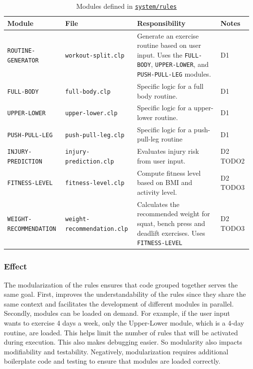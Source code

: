 \documentclass{article}
\begin{document}
\begin{table}[h]
\centering
\begin{tabular}{|l|l|p{5cm}|l|}
\hline
\textbf{Module} & \textbf{File} & \textbf{Responsibility} & \textbf{Notes} \\
\hline
\texttt{ROUTINE-GENERATOR} & \texttt{workout-split.clp} & Generate an exercise routine based on user input. Uses the \texttt{FULL-BODY}, \texttt{UPPER-LOWER}, and \texttt{PUSH-PULL-LEG} modules. & D1 \\
\hline
\texttt{FULL-BODY} & \texttt{full-body.clp} & Specific logic for a full body routine. & D1 \\
\hline
\texttt{UPPER-LOWER} & \texttt{upper-lower.clp} & Specific logic for a upper-lower routine. & D1 \\
\hline
\texttt{PUSH-PULL-LEG} & \texttt{push-pull-leg.clp} & Specific logic for a push-pull-leg routine & D1 \\
\hline
\texttt{INJURY-PREDICTION} & \texttt{injury-prediction.clp} & Evaluates injury risk from user input. & D2 TODO2 \\
\hline
\texttt{FITNESS-LEVEL} & \texttt{fitness-level.clp} & Compute fitness level based on BMI and activity level. & D2 TODO3 \\
\hline
\texttt{WEIGHT-RECOMMENDATION} & \texttt{weight-recommendation.clp} & Calculates the recommended weight for squat, bench press and deadlift exercises. Uses \texttt{FITNESS-LEVEL} & D2 TODO3 \\
\hline
\end{tabular}
\caption{Modules defined in \href{https://github.com/joshpham97/COMP474Project_OptionB_PhamTran_ExerciseRecommender/tree/main/system/rules}{\texttt{system/rules}}}
\label{tab:modules}
\end{table}


\subsubsection{Effect}

The modularization of the rules ensures that code grouped together serves the same goal. First, improves the understandability of the rules since they share the same context and facilitates the development of different modules in parallel. Secondly, modules can be loaded on demand. For example, if the user input wants to exercise 4 days a week, only the Upper-Lower module, which is a 4-day routine, are loaded. This helps limit the number of rules that will be activated during execution. This also makes debugging easier. So modularity also impacts modifiability and testability. Negatively, modularization requires additional boilerplate code and testing to ensure that modules are loaded correctly. 
\end{document}
